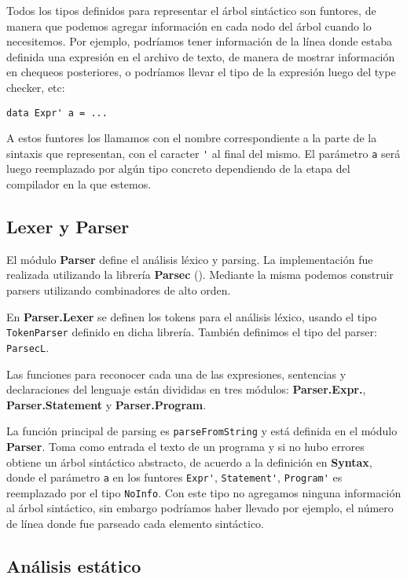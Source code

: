 \documentclass[a4paper,10pt]{article}
\begin{document}
Todos los tipos definidos para representar el árbol sintáctico son funtores, de manera que podemos agregar información en cada nodo del árbol cuando
lo necesitemos. Por ejemplo, podríamos tener información de la línea donde estaba definida una expresión en el archivo de texto, de manera de mostrar
información en chequeos posteriores, o podríamos llevar el tipo de la expresión luego del type checker, etc:
\begin{center}
  \verb|data Expr' a = ...| 
\end{center}

A estos funtores los llamamos con el nombre correspondiente a la parte de la sintaxis que representan, con el caracter \verb|'| al final del mismo.
El parámetro \verb|a| será luego reemplazado por algún tipo concreto dependiendo de la etapa del compilador en la que estemos.



\subsection{Lexer y Parser}

El módulo \textbf{Parser} define el análisis léxico y parsing. La implementación fue realizada utilizando la librería \textbf{Parsec}
(\cite{parsec}).
Mediante la  misma podemos construir parsers utilizando combinadores de alto orden.

En \textbf{Parser.Lexer} se definen los tokens para el análisis léxico, usando el tipo \verb|TokenParser| definido en dicha librería. También definimos
el tipo del parser: \verb|ParsecL|. 

Las funciones para reconocer cada una de las expresiones, sentencias y declaraciones del lenguaje están divididas en tres módulos: \textbf{Parser.Expr.}, 
\textbf{Parser.Statement} y \textbf{Parser.Program}.

La función principal de parsing es \verb|parseFromString| y está definida en el módulo \textbf{Parser}. Toma como entrada el texto de un programa
y si no hubo errores obtiene un árbol sintáctico abstracto, de acuerdo a la definición en \textbf{Syntax}, donde el parámetro \verb|a| en los funtores
\verb|Expr'|, \verb|Statement'|, \verb|Program'| es reemplazado por el tipo \verb|NoInfo|. Con este tipo no agregamos ninguna información
al árbol sintáctico, sin embargo podríamos haber llevado por ejemplo, el número de línea donde fue parseado cada elemento sintáctico.


\subsection{Análisis estático}
\end{document}
